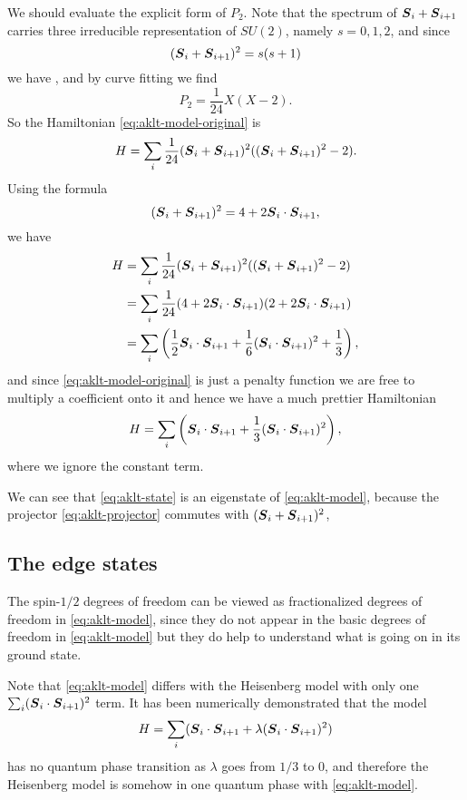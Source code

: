 \documentclass[hyperref, a4paper]{article}
\begin{document}
We should evaluate the explicit form of $P_2$. Note that the spectrum of $\vb*{S}_i + \vb*{S}_{i+1}$ carries three irreducible representation of $SU(2)$, namely $s = 0, 1, 2$, and since 
\[
    (\vb*{S}_i + \vb*{S}_{i+1})^2 = s(s+1)
\]
we have , and by curve fitting we find 
\[
    P_2 = \frac{1}{24} X (X-2).
\]
So the Hamiltonian \eqref{eq:aklt-model-original} is 
\begin{equation}
    H = \sum_i \frac{1}{24} (\vb*{S}_i + \vb*{S}_{i+1})^2 ((\vb*{S}_i + \vb*{S}_{i+1})^2 -2).
\end{equation}
Using the formula
\[
    (\vb*{S}_i + \vb*{S}_{i+1})^2 = 4 + 2 \vb*{S}_i \cdot \vb*{S}_{i+1},
\]
we have 
\[
    \begin{aligned}
        H &= \sum_i \frac{1}{24} (\vb*{S}_i + \vb*{S}_{i+1})^2 ((\vb*{S}_i + \vb*{S}_{i+1})^2 -2) \\
        &= \sum_i \frac{1}{24} (4 + 2 \vb*{S}_i \cdot \vb*{S}_{i+1}) (2 + 2 \vb*{S}_i \cdot \vb*{S}_{i+1}) \\
        &= \sum_i \left( \frac{1}{2} \vb*{S}_i \cdot \vb*{S}_{i+1} + \frac{1}{6} (\vb*{S}_i \cdot \vb*{S}_{i+1})^2 + \frac{1}{3} \right),
    \end{aligned}
\]
and since \eqref{eq:aklt-model-original} is just a penalty function we are free to multiply a coefficient onto it and hence we have a much prettier Hamiltonian
\begin{equation}
    H = \sum_i \left( \vb*{S}_{i} \cdot \vb*{S}_{i+1} + \frac{1}{3} (\vb*{S}_i \cdot \vb*{S}_{i+1})^2 \right),
    \label{eq:aklt-model}
\end{equation}
where we ignore the constant term. 

We can see that \eqref{eq:aklt-state} is an eigenstate of \eqref{eq:aklt-model}, because the projector \eqref{eq:aklt-projector} commutes with $(\vb*{S}_i + \vb*{S}_{i+1})^2$, 

\subsection{The edge states}

The spin-$1/2$ degrees of freedom can be viewed as fractionalized degrees of freedom in \eqref{eq:aklt-model}, since they do not appear in the basic degrees of freedom in \eqref{eq:aklt-model} but they do help to understand what is going on in its ground state.

Note that \eqref{eq:aklt-model} differs with the Heisenberg model with only one $\sum_i (\vb*{S}_i \cdot \vb*{S}_{i+1})^2$ term. 
It has been numerically demonstrated that the model
\begin{equation}
    H = \sum_i (\vb*{S}_{i} \cdot \vb*{S}_{i+1} + \lambda (\vb*{S}_i \cdot \vb*{S}_{i+1})^2)
\end{equation}
has no quantum phase transition as $\lambda$ goes from $1/3$ to $0$, and therefore the Heisenberg model is somehow in one quantum phase with \eqref{eq:aklt-model}. 
\end{document}
